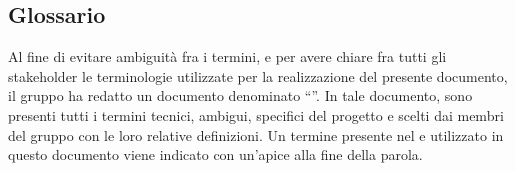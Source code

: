 \subsection{Glossario}
Al fine di evitare ambiguità fra i termini, e per avere chiare fra tutti gli stakeholder le terminologie utilizzate per la realizzazione del presente documento, il gruppo \Gruppo{} ha redatto un documento denominato “”.
In tale documento, sono presenti tutti i termini tecnici, ambigui, specifici del progetto e scelti dai membri del gruppo con le loro relative definizioni.
Un termine presente nel  e utilizzato in questo documento viene indicato con un'apice  alla fine della parola.
